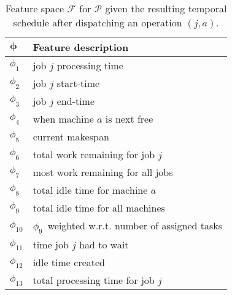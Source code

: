 \documentclass[graybox]{svmult}
\newcommand{\vphi}{{\boldsymbol{\phi}}}
\newcommand{\phiproc}{$\phi_1$}
\newcommand{\phistartTime}{$\phi_2$}
\newcommand{\phiendTime}{$\phi_3$}
\newcommand{\phimacFree}{$\phi_4$}
\newcommand{\phimakespan}{$\phi_5$}
\newcommand{\phiwrmJob}{$\phi_6$}
\newcommand{\phiwrmMWR}{$\phi_7$}
\newcommand{\phislots}{$\phi_{8}$}
\newcommand{\phislotsTotal}{$\phi_{9}$}
\newcommand{\phislotsTotalperOp}{$\phi_{10}$}
\newcommand{\phiwait}{$\phi_{11}$}
\newcommand{\phislotCreated}{$\phi_{12}$}
\newcommand{\phitotProc}{$\phi_{13}$}
\begin{document}
\begin{table}[p]
	\caption{Feature space $\mathcal{F}$ for $\mathcal{P}$ given the resulting 
	temporal schedule after dispatching an operation $(j,a)$.  }
	\label{tbl:jssp:feat}
	
	\centering
	\begin{tabular}{ll} %
		\toprule
		$\vphi$             & Feature description                                      \\
		\midrule
		\phiproc            & job $j$ processing time                                  \\
		\phistartTime       & job $j$ start-time                                       \\
		\phiendTime         & job $j$ end-time                                         \\
		\phimacFree         & when machine $a$ is next free                            \\
		\phimakespan        & current makespan                                         \\   
		\phiwrmJob          & total work remaining for job $j$                         \\
		\phiwrmMWR          & most work remaining for all jobs                         \\
		\phislots           & total idle time for machine $a$                          \\
		\phislotsTotal      & total idle time for all machines                         \\
		\phislotsTotalperOp & \phislotsTotal\ weighted w.r.t. number of assigned tasks \\
		\phiwait            & time job $j$ had to wait                                 \\
		\phislotCreated     & idle time created                                        \\      
		\phitotProc         & total processing time for job $j$                        \\
		\bottomrule
	\end{tabular}
\end{table}
\end{document}
